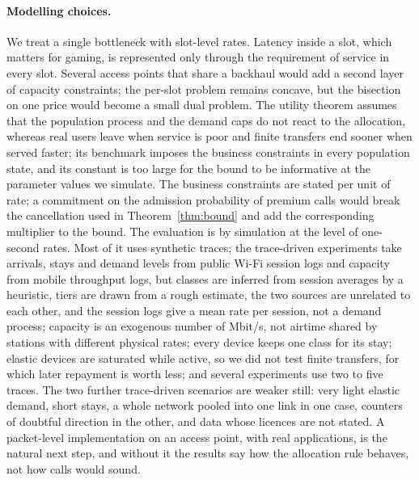 \documentclass[preprint,11pt]{elsarticle}
\theoremstyle{definition}
\theoremstyle{remark}
\begin{document}
\paragraph{Modelling choices.}
We treat a single bottleneck with slot-level rates.
Latency inside a slot, which matters for gaming, is represented only through the requirement of service in every slot.
Several access points that share a backhaul would add a second layer of capacity constraints; the per-slot problem remains concave, but the bisection on one price would become a small dual problem.
The utility theorem assumes that the population process and the demand caps do not react to the allocation, whereas real users leave when service is poor and finite transfers end sooner when served faster; its benchmark imposes the business constraints in every population state, and its constant is too large for the bound to be informative at the parameter values we simulate.
The business constraints are stated per unit of rate; a commitment on the admission probability of premium calls would break the cancellation used in Theorem~\ref{thm:bound} and add the corresponding multiplier to the bound.
The evaluation is by simulation at the level of one-second rates. Most of it uses synthetic traces; the trace-driven experiments take arrivals, stays and demand levels from public Wi-Fi session logs and capacity from mobile throughput logs, but classes are inferred from session averages by a heuristic, tiers are drawn from a rough estimate, the two sources are unrelated to each other, and the session logs give a mean rate per session, not a demand process; capacity is an exogenous number of Mbit/s, not airtime shared by stations with different physical rates; every device keeps one class for its stay; elastic devices are saturated while active, so we did not test finite transfers, for which later repayment is worth less; and several experiments use two to five traces. The two further trace-driven scenarios are weaker still: very light elastic demand, short stays, a whole network pooled into one link in one case, counters of doubtful direction in the other, and data whose licences are not stated. A packet-level implementation on an access point, with real applications, is the natural next step, and without it the results say how the allocation rule behaves, not how calls would sound.
\end{document}
